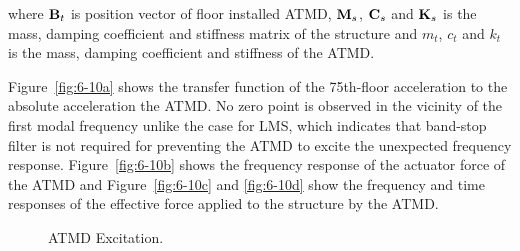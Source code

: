 where $\mathbf{B}_{t}$ is position vector of floor installed ATMD, $\mathbf{M}_{s}$, $\mathbf{C}_{s}$ and $\mathbf{K}_{s}$ is the mass, damping coefficient and stiffness matrix of the structure and $m_{t}$, $c_{t}$ and $k_{t}$ is the mass, damping coefficient and stiffness of the ATMD. 

Figure~\ref{fig:6-10a} shows the transfer function of the 75th-floor acceleration to the absolute acceleration the ATMD. No zero point is observed in the vicinity of the first modal frequency unlike the case for LMS, which indicates that band-stop filter is not required for preventing the ATMD to excite the unexpected frequency response. Figure~\ref{fig:6-10b} shows the frequency response of the actuator force of the ATMD and Figure~\ref{fig:6-10c} and \ref{fig:6-10d} show the frequency and time responses of the effective force applied to the structure by the ATMD.

\begin{figure}[!ht]
\centering
{}
\caption{ATMD Excitation.}
\label{fig:6-10}
\end{figure}

